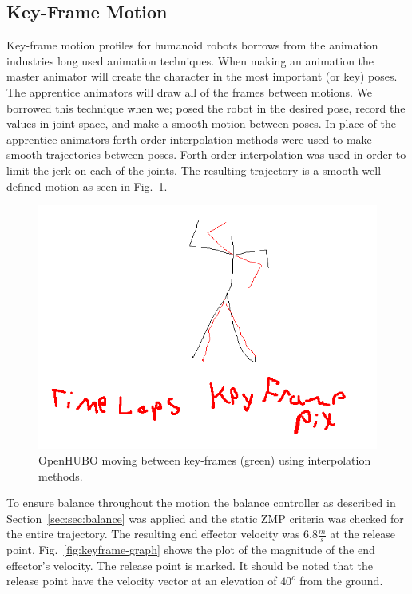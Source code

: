 \subsection{Key-Frame Motion}\label{sec:sec:keyframe}

Key-frame motion profiles for humanoid robots borrows from the animation industries long used animation techniques.  
When making an animation the master animator will create the character in the most important (or key) poses.  
The apprentice animators will draw all of the frames between motions.  
We borrowed this technique when we; posed the robot in the desired pose, record the values in joint space, and make a smooth motion between poses.  
In place of the apprentice animators forth order interpolation methods were used to make smooth trajectories between poses.  
Forth order interpolation was used in order to limit the jerk on each of the joints.  
The resulting trajectory is a smooth well defined motion as seen in Fig.~\ref{fig:keyframe-throw}.

\begin{figure}[t]
  \centering
\includegraphics[width=1.0\columnwidth]{./pix/fakeThrow.png}
  \caption{OpenHUBO moving between key-frames (green) using interpolation methods.}
  \label{fig:keyframe-throw}
\end{figure}

To ensure balance throughout the motion the balance controller as described in Section~\ref{sec:sec:balance} was applied and the static ZMP criteria was checked for the entire trajectory.
The resulting end effector velocity was $6.8\frac{m}{s}$ at the release point.  
Fig.~\ref{fig:keyframe-graph} shows the plot of the magnitude of the end effector's velocity.  
The release point is marked.  
It should be noted that the release point have the velocity vector at an elevation of $40^o$ from the ground.

